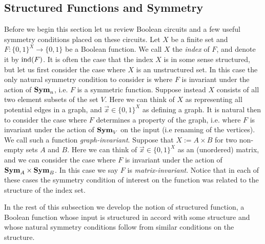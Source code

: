 \documentclass[../paper.tex]{subfiles}
\begin{document}
\subsection{Structured Functions and Symmetry}
Before we begin this section let us review Boolean circuits and a few useful
symmetry conditions placed on these circuits. Let $X$ be a finite set and $F:
\{0,1\}^{X} \rightarrow \{0,1\}$ be a Boolean function. We call $X$ the
\emph{index} of $F$, and denote it by $\text{\upshape ind}(F)$. It is often the case that the
index $X$ is in some sense structured, but let us first consider the case where
$X$ is an unstructured set. In this case the only natural symmetry condition to
consider is where $F$ is invariant under the action of $\text{\textbf{Sym}}_n$, i.e. $F$ is a
symmetric function. Suppose instead $X$ consists of all two element subsets of
the set $V$. Here we can think of $X$ as representing all potential edges in a
graph, and $\vec{x} \in \{0,1\}^X$ as defining a graph. It is natural then to
consider the case where $F$ determines a property of the graph, i.e. where $F$
is invariant under the action of $\text{\textbf{Sym}}_V$ on the input (i.e renaming of the
vertices). We call such a function \emph{graph-invariant}. Suppose that $X := A
\times B$ for two non-empty sets $A$ and $B$. Here we can think of $\vec{x} \in
\{0,1\}^X$ as an (unordered) matrix, and we can consider the case where $F$ is
invariant under the action of $\text{\textbf{Sym}}_A \times \text{\textbf{Sym}}_B$. In this case we say $F$ is
\emph{matrix-invariant}. Notice that in each of these cases the symmetry
condition of interest on the function was related to the structure of the index
set.

In the rest of this subsection we develop the notion of structured function, a
Boolean function whose input is structured in accord with some structure and
whose natural symmetry conditions follow from similar conditions on the
structure.



\end{document}
